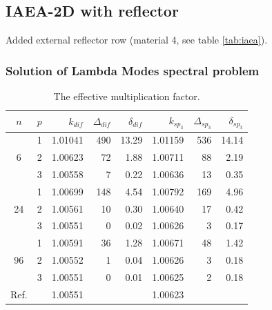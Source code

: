 \documentclass[authoryear]{elsarticle}
\begin{document}
\subsection{IAEA-2D with reflector}
Added external reflector row (material 4, see table \ref{tab:iaea}). 

\subsubsection{Solution of Lambda Modes spectral problem}

\begin{table}[h]
\caption{The effective multiplication factor.}
\label{tab:iaea_with_lambda}
\begin{center}
\begin{tabular}{c c r r r r r r}
\hline
$n$ & $p$ & $k_{dif}$ & $\Delta_{dif}$ & $\delta_{dif}$ &$k_{sp_3}$& $\Delta_{sp_3}$ & $\delta_{sp_3}$ \\
\hline
	& 1	& 1.01041& 490&13.29& 1.01159& 536& 14.14\\
6	& 2	& 1.00623&  72& 1.88& 1.00711&  88&  2.19\\
	& 3	& 1.00558&   7& 0.22& 1.00636&  13&  0.35\\ 
\hline
	& 1	& 1.00699& 148& 4.54& 1.00792& 169&  4.96\\
24& 2	& 1.00561&  10& 0.30& 1.00640&  17&  0.42\\
	& 3	& 1.00551&   0& 0.02& 1.00626&   3&  0.17\\ 
\hline
	& 1	& 1.00591&  36& 1.28& 1.00671&  48&  1.42\\
96& 2	& 1.00552&   1& 0.04& 1.00626&   3&  0.18\\
	& 3	& 1.00551&   0& 0.01& 1.00625&   2&  0.18\\ 
\hline
Ref.&   & 1.00551&    &     & 1.00623&     &\\ 
\hline
\end{tabular}
\end{center}
\end{table}
\end{document}
